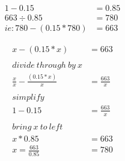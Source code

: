 \documentclass[20pt]{article}
\begin{document}
\begin{align*}
1 - 0.15 &= 0.85 \\
663 \div 0.85 &= 780 \\
ie: 780 - (0.15*780) &= 663
\end{align*}

\begin{align*}
	x - (0.15*x) &= 663 \\ \\
	divide \ through \ by \ x \\
	\frac{x}{x} - \frac{(0.15*x)}{x} &= \frac{663}{x} \\ \\
	simplify \\
	1 - 0.15 &= \frac{663}{x} \\ \\
	bring \ x \ to \ left \\
	x*0.85 &= 663 \\
	x = \frac{663}{0.85} &= 780
\end{align*}
\end{document}
